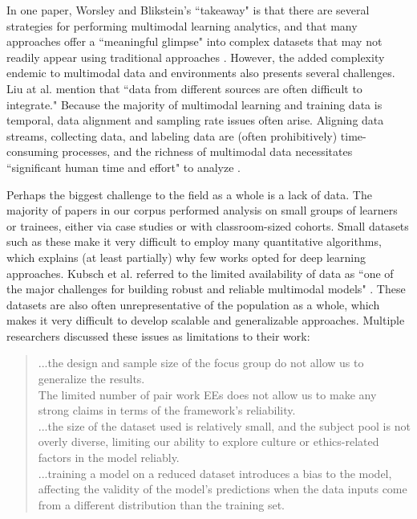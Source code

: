 \documentclass[manuscript,screen,review]{acmart}
\begin{document}
In one paper, Worsley and Blikstein's ``takeaway" is that there are several strategies for performing multimodal learning analytics, and that many approaches offer a ``meaningful glimpse" into complex datasets that may not readily appear using traditional approaches \cite{3095923626}. However, the added complexity endemic to multimodal data and environments also presents several challenges. Liu at al. \cite{3783339081} mention that ``data from different sources are often difficult to integrate." Because the majority of multimodal learning and training data is temporal, data alignment and sampling rate issues often arise. Aligning data streams, collecting data, and labeling data are (often prohibitively) time-consuming processes, and the richness of multimodal data necessitates ``significant human time and effort" to analyze \cite{3796180663}.  

Perhaps the biggest challenge to the field as a whole is a lack of data. The majority of papers in our corpus performed analysis on small groups of learners or trainees, either via case studies or with classroom-sized cohorts. Small datasets such as these make it very difficult to employ many quantitative algorithms, which explains (at least partially) why few works opted for deep learning approaches. Kubsch et al. referred to the limited availability of data as ``one of the major challenges for building robust and reliable multimodal models" \cite{32184286}. These datasets are also often unrepresentative of the population as a whole, which makes it very difficult to develop scalable and generalizable approaches. Multiple researchers discussed these issues as limitations to their work:

\begin{quote}
    ...the design and sample size of the focus group do not allow us to generalize the results. \cite{2609260641}\\
    
    The limited number of pair work EEs does not allow us to make any strong claims in terms of the framework’s reliability. \cite{2155422499}\\
    
    ...the size of the dataset used is relatively small, and the subject pool is not overly diverse, limiting our ability to explore culture or ethics-related factors in the model reliably. \cite{1426267857}\\
    
    ...training a model on a reduced dataset introduces a bias to the model, affecting the validity of the model’s predictions when the data inputs come from a different distribution than the training set. \cite{32184286}
\end{quote}
     
\end{document}
